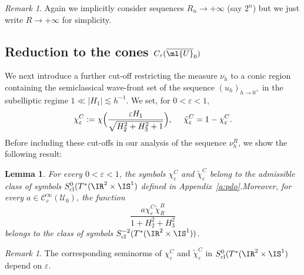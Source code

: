 \documentclass[10pt]{amsart}
\theoremstyle{plain}
\newtheorem{lemm}[theo]{Lemma}
\theoremstyle{definition}
\theoremstyle{remark}
\newtheorem{rema}[theo]{Remark}
\begin{document}
\begin{rema}
Again we implicitly consider sequences $R_n\to +\infty$ (say $2^n$) but we just write $R\to +\infty$ for simplicity.
\end{rema}

\subsection{Reduction to the cones $C_\varepsilon(\overline{\ml{U}}_0)$}
\label{ss:points-infinity}

We next introduce a further cut-off restricting the measure $\nu_h$ to a conic region containing the semiclassical wave-front set of the sequence $(u_h)_{h\to 0^+}$ in the subelliptic regime $1 \ll \vert H_1 \vert\lesssim h^{-1}$. We set, for $0<\varepsilon< 1$,
\begin{equation}%
\chi_\varepsilon^C:=\chi\Bigl(\frac{\varepsilon H_1}{\sqrt{H_2^2+H_3^2+1}}\Bigr),\ \quad\tilde{\chi}_\varepsilon^C=1-\chi_\varepsilon^C.
\end{equation}
Before including these cut-offs in our analysis of the sequence $\nu_h^R$, we show the following result:

\begin{lemm}\label{l:symbol} For every $0<\varepsilon<1$, the symbols $\chi_\varepsilon^C$ and $\tilde{\chi}_\varepsilon^C$ belong to the admissible class of symbols $S^0_{\operatorname{cl}}(T^*(\IR^2\times\IS^1)$ defined in Appendix~\ref{a:pdo}.Moreover, for every $a\in\mathcal{C}^\infty_c(\mathcal{U}_0)$, the function
\[
\frac{a\chi_\varepsilon^C\tilde{\chi}_R^B}{1+H_2^2+H_3^2}
\]
belongs to the class of symbols $S^{-2}_{\operatorname{cl}}(T^*(\IR^2\times\IS^1))$.
\end{lemm}
\begin{rema}
The corresponding seminorms of $\chi_\varepsilon^C$ and $\tilde{\chi}_\varepsilon^C$ in $S^0_{\operatorname{cl}}(T^*(\IR^2\times\IS^1)$ depend on $\varepsilon$.
\end{rema}
\end{document}
